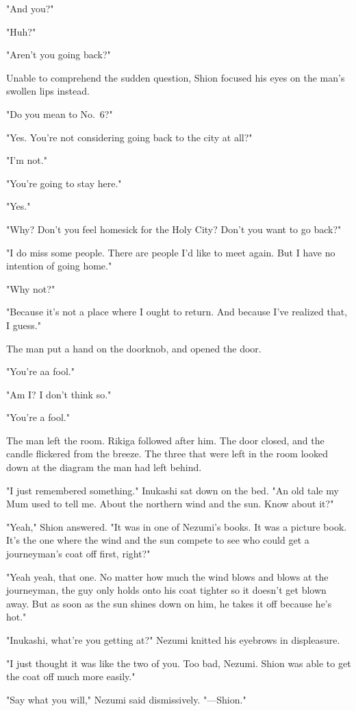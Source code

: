 "And you?"

"Huh?"

"Aren't you going back?"

Unable to comprehend the sudden question, Shion focused his eyes on the
man's swollen lips instead.

"Do you mean to No.~6?"

"Yes. You're not considering going back to the city at all?"

"I'm not."

"You're going to stay here."

"Yes."

"Why? Don't you feel homesick for the Holy City? Don't you want to go
back?"

"I do miss some people. There are people I'd like to meet again. But I
have no intention of going home."

"Why not?"

"Because it's not a place where I ought to return. And because I've
realized that, I guess."

The man put a hand on the doorknob, and opened the door.

"You're a\el a fool."

"Am I? I don't think so."

"You're a fool."

The man left the room. Rikiga followed after him. The door closed, and
the candle flickered from the breeze. The three that were left in the
room looked down at the diagram the man had left behind.

"I just remembered something." Inukashi sat down on the bed. "An old
tale my Mum used to tell me. About the northern wind and the sun. Know
about it?"

"Yeah," Shion answered. "It was in one of Nezumi's books. It was a
picture book. It's the one where the wind and the sun compete to see who
could get a journeyman's coat off first, right?"

"Yeah yeah, that one. No matter how much the wind blows and blows at the
journeyman, the guy only holds onto his coat tighter so it doesn't get
blown away. But as soon as the sun shines down on him, he takes it off
because he's hot."

"Inukashi, what're you getting at?" Nezumi knitted his eyebrows in
displeasure.

"I just thought it was like the two of you. Too bad, Nezumi. Shion was
able to get the coat off much more easily."

"Say what you will," Nezumi said dismissively. "---Shion."

